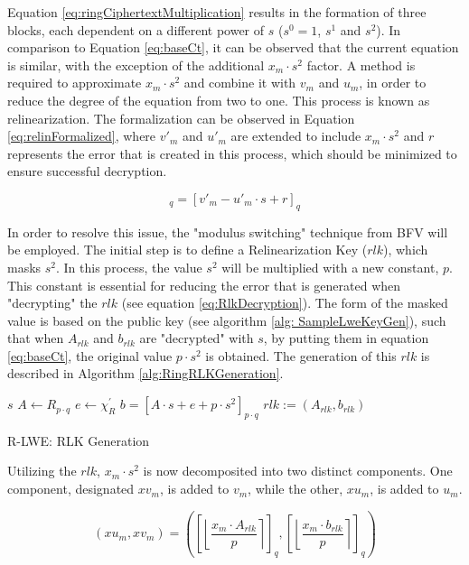 Equation \ref{eq:ringCiphertextMultiplication} results in the formation of three blocks, each dependent on a different power of $s$ ($s^0=1$, $s^1$ and $s^2$). In comparison to Equation \ref{eq:baseCt}, it can be observed that the current equation is similar, with the exception of the additional $x_m\cdot s^2$ factor. A method is required to approximate $x_m\cdot s^2$ and combine it with $v_m$ and $u_m$, in order to reduce the degree of the equation from two to one. This process is known as relinearization. The formalization can be observed in Equation \ref{eq:relinFormalized}, where $v'_m$ and $u'_m$ are extended to include $x_m\cdot s^2$ and $r$ represents the error that is created in this process, which should be minimized to ensure successful decryption. 

\begin{equation}
  [v_m - u_m\cdot s + x_m \cdot s^2]_q = [v'_m - u'_m\cdot s + r]_q
  \label{eq:relinFormalized}
\end{equation}

In order to resolve this issue, the "modulus switching" technique from BFV will be employed. The initial step is to define a Relinearization Key ($rlk$), which masks $s^2$. In this process, the value $s^2$ will be multiplied with a new constant, $p$. This constant is essential for reducing the error that is generated when "decrypting" the $rlk$ (see equation \ref{eq:RlkDecryption}).
The form of the masked value is based on the public key (see algorithm \ref{alg: SampleLweKeyGen}), such that when $A_{rlk}$ and $b_{rlk}$ are "decrypted" with $s$, by putting them in equation \ref{eq:baseCt}, the original value $p\cdot s^2$ is obtained. The generation of this $rlk$ is described in Algorithm \ref{alg:RingRLKGeneration}.

\begin{algorithm}[htb]
  \begin{algorithmic}[1]
    \REQUIRE $s$
    \STATE $A \leftarrow R_{p \cdot q}$
    \STATE $e \leftarrow \chi_R^{'}$
    \STATE $b = [A\cdot s+e+p\cdot s^2]_{p \cdot q}$
    \RETURN $rlk:=(A_{rlk}, b_{rlk})$
  \end{algorithmic}
  \caption{R-LWE: RLK Generation}
  \label{alg:RingRLKGeneration}
\end{algorithm}

Utilizing the $rlk$, $x_m\cdot s^2$ is now decomposited into two distinct components. One component, designated $xv_m$, is added to $v_m$, while the other, $xu_m$, is added to $u_m$.

\begin{equation}
  (xu_m, xv_m) = \left(\left[\left\lfloor \frac{x_m \cdot A_{rlk}}{p}  \right\rceil \right]_q, \left[\left\lfloor \frac{x_m \cdot b_{rlk}}{p}  \right\rceil \right]_q\right)
  \label{eq:ringXmSplitting}
\end{equation}

